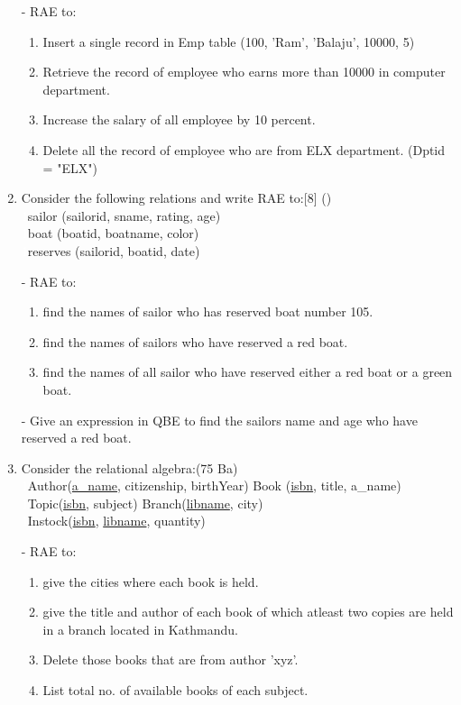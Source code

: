 \documentclass[12pt]{article}
\newcommand{\enter}{\\\textcolor{white}{1}}
\begin{document}
\begin{enumerate}
        - RAE to: 
        \begin{enumerate}[noitemsep, topsep = 0pt, label = \alph*.]
            \item Insert a single record in Emp table (100, 'Ram', 'Balaju', 10000, 5)
            \item Retrieve the record of employee who earns more than 10000 in computer department.
            \item Increase the salary of all employee by 10 percent.
            \item Delete all the record of employee who are from ELX department. (Dptid = "ELX")
        \end{enumerate}

    \item Consider the following relations and write RAE to:\hfill[8] ()
        \enter sailor (sailorid, sname, rating, age)
        \enter boat (boatid, boatname, color)
        \enter reserves (sailorid, boatid, date)
        
        - RAE to:	
        \begin{enumerate}[noitemsep, topsep = 0pt, label = \alph*.]
            \item find the names of sailor who has reserved boat number 105.
            \item find the names of sailors who have reserved a red boat.
            \item find the names of all sailor who have reserved either a red boat or a green boat.
        \end{enumerate}
    - Give an expression in QBE to find the sailors name and age who have reserved a red boat.

    \item Consider the relational algebra:\hfill(75 Ba)
        \enter Author(\underline{a\_name}, citizenship, birthYear) \hspace{2cm} Book (\underline{isbn}, title, a\_name)
        \enter Topic(\underline{isbn}, subject) \hspace{5.5cm} Branch(\underline{libname}, city)
        \enter Instock(\underline{isbn}, \underline{libname}, quantity)

        - RAE to:
        \begin{enumerate}[noitemsep, topsep = 0pt, label = \alph*.]
            \item give the cities where each book is held.
            \item give the title and author of each book of which atleast two copies are held in a branch located in Kathmandu.
            \item Delete those books that are from author 'xyz'.
            \item List total no. of available books of each subject.
        \end{enumerate}


\end{enumerate}
\end{document}
